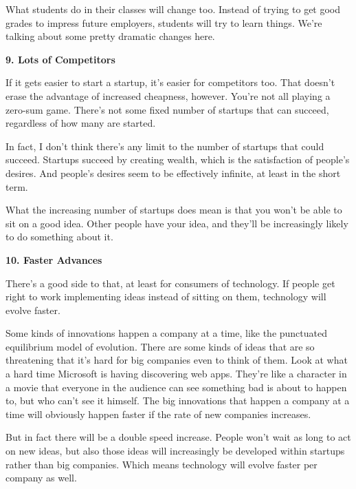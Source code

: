 What
                    students do in their classes will change too. Instead of
                    trying to get good grades to impress future employers,
                    students will try to learn things. We're talking about some
                    pretty dramatic changes here.

\textbf{9. Lots of Competitors}

If it gets easier to start a startup, it's
                    easier for competitors too. That doesn't erase the advantage
                    of increased cheapness, however. You're not all playing a
                    zero-sum game. There's not some fixed number of startups
                    that can succeed, regardless of how many are started.

In
                    fact, I don't think there's any limit to the number of
                    startups that could succeed. Startups succeed by creating
                    wealth, which is the satisfaction of people's desires. And
                    people's desires seem to be effectively infinite, at least
                    in the short term.

What the increasing number of
                    startups does mean is that you won't be able to sit on a
                    good idea. Other people have your idea, and they'll be
                    increasingly likely to do something about it.

\textbf{10. Faster Advances}

There's a good side to that, at least for
                    consumers of technology. If people get right to work
                    implementing ideas instead of sitting on them, technology
                    will evolve faster.

Some kinds of innovations
                    happen a company at a time, like the punctuated equilibrium
                    model of evolution. There are some kinds of ideas that are
                    so threatening that it's hard for big companies even to
                    think of them. Look at what a hard time Microsoft is having
                    discovering web apps. They're like a character in a movie
                    that everyone in the audience can see something bad is about
                    to happen to, but who can't see it himself. The big
                    innovations that happen a company at a time will obviously
                    happen faster if the rate of new companies increases.

But
                    in fact there will be a double speed increase. People won't
                    wait as long to act on new ideas, but also those ideas will
                    increasingly be developed within startups rather than big
                    companies. Which means technology will evolve faster per
                    company as well.

